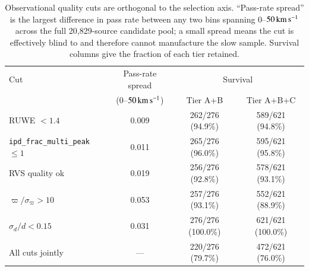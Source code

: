 \begin{table}
\caption{Observational quality cuts are orthogonal to the \vgrf{}
  selection axis.  ``Pass-rate spread'' is the largest difference in
  pass rate between any two \vgrf{} bins spanning $0$--$50\,\mathrm{km\,s^{-1}}$ across
  the full 20{,}829-source candidate pool; a small spread means the cut
  is effectively blind to \vgrf{} and therefore cannot manufacture the
  slow sample.  Survival columns give the fraction of each tier retained.}
\label{tab:cut_orthogonality}
\centering
\begin{tabular}{lccc}
\hline\hline
Cut & Pass-rate spread & \multicolumn{2}{c}{Survival} \\
 & ($0$--$50\,\mathrm{km\,s^{-1}}$) & Tier A+B & Tier A+B+C \\
\hline
RUWE $<1.4$ & 0.009 & 262/276 (94.9\%) & 589/621 (94.8\%) \\
\texttt{ipd\_frac\_multi\_peak} $\leq 1$ & 0.011 & 265/276 (96.0\%) & 595/621 (95.8\%) \\
RVS quality ok & 0.019 & 256/276 (92.8\%) & 578/621 (93.1\%) \\
$\varpi/\sigma_\varpi>10$ & 0.053 & 257/276 (93.1\%) & 552/621 (88.9\%) \\
$\sigma_d/d<0.15$ & 0.031 & 276/276 (100.0\%) & 621/621 (100.0\%) \\
\hline
All cuts jointly & --- & 220/276 (79.7\%) & 472/621 (76.0\%) \\
\hline
\end{tabular}
\end{table}
